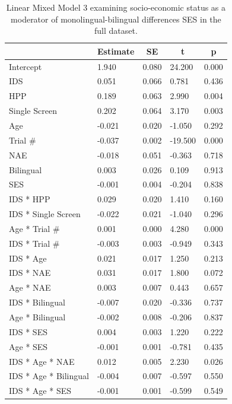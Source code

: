 \documentclass[english,,man,floatsintext]{apa6}
\begin{document}
\begin{table}[tbp]

\begin{center}
\begin{threeparttable}

\caption{\label{tab:unnamed-chunk-11}Linear Mixed Model 3 examining socio-economic status as a moderator of monolingual-bilingual differences SES in the full dataset.}

\begin{tabular}{lllll}
\toprule
 & \multicolumn{1}{c}{Estimate} & \multicolumn{1}{c}{SE} & \multicolumn{1}{c}{t} & \multicolumn{1}{c}{p}\\
\midrule
Intercept & 1.940 & 0.080 & 24.200 & 0.000\\
IDS & 0.051 & 0.066 & 0.781 & 0.436\\
HPP & 0.189 & 0.063 & 2.990 & 0.004\\
Single Screen & 0.202 & 0.064 & 3.170 & 0.003\\
Age & -0.021 & 0.020 & -1.050 & 0.292\\
Trial \# & -0.037 & 0.002 & -19.500 & 0.000\\
NAE & -0.018 & 0.051 & -0.363 & 0.718\\
Bilingual & 0.003 & 0.026 & 0.109 & 0.913\\
SES & -0.001 & 0.004 & -0.204 & 0.838\\
IDS * HPP & 0.029 & 0.020 & 1.410 & 0.160\\
IDS * Single Screen & -0.022 & 0.021 & -1.040 & 0.296\\
Age * Trial \# & 0.001 & 0.000 & 4.280 & 0.000\\
IDS * Trial \# & -0.003 & 0.003 & -0.949 & 0.343\\
IDS * Age & 0.021 & 0.017 & 1.250 & 0.213\\
IDS * NAE & 0.031 & 0.017 & 1.800 & 0.072\\
Age * NAE & 0.003 & 0.007 & 0.443 & 0.657\\
IDS * Bilingual & -0.007 & 0.020 & -0.336 & 0.737\\
Age * Bilingual & -0.002 & 0.008 & -0.206 & 0.837\\
IDS * SES & 0.004 & 0.003 & 1.220 & 0.222\\
Age * SES & -0.001 & 0.001 & -0.781 & 0.435\\
IDS * Age * NAE & 0.012 & 0.005 & 2.230 & 0.026\\
IDS * Age * Bilingual & -0.004 & 0.007 & -0.597 & 0.550\\
IDS * Age * SES & -0.001 & 0.001 & -0.599 & 0.549\\
\bottomrule
\end{tabular}

\end{threeparttable}
\end{center}

\end{table}
\end{document}

